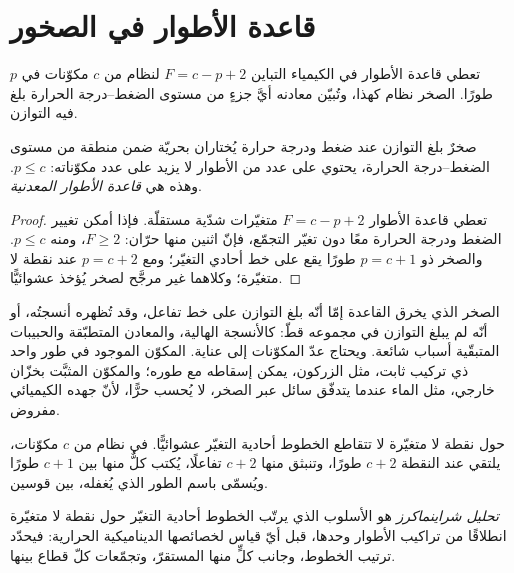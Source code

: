 \section{قاعدة الأطوار في الصخور}\label{sec:b3:petrological-thermodynamics:phase-rule}

تعطي قاعدة الأطوار في الكيمياء التباين $F = c - p + 2$ لنظام من
$c$ مكوّنات في $p$ طورًا. الصخر نظام كهذا، وتُبيّن معادنه
أيَّ جزءٍ من مستوى الضغط--درجة الحرارة بلغ فيه التوازن.

\begin{proposition}\label{prop:b3:petrological-thermodynamics:goldschmidt}
صخرٌ بلغ التوازن عند ضغط ودرجة حرارة يُختاران
بحريّة ضمن منطقة من مستوى الضغط--درجة الحرارة، يحتوي على عدد من الأطوار
لا يزيد على عدد مكوّناته: $p \le c$. وهذه هي
\emph{قاعدة الأطوار المعدنية}.
\end{proposition}

\begin{proof}
تعطي قاعدة الأطوار $F = c - p + 2$ متغيّرات شدّية مستقلّة. فإذا أمكن
تغيير الضغط ودرجة الحرارة معًا دون تغيّر التجمّع، فإنّ اثنين منها حرّان:
$F \ge 2$، ومنه $p \le c$. والصخر ذو $p = c + 1$ طورًا يقع
على خط أحادي التغيّر؛ ومع $p = c + 2$ عند نقطة لا متغيّرة؛ وكلاهما
غير مرجَّح لصخر يُؤخذ عشوائيًّا.
\end{proof}

الصخر الذي يخرق القاعدة إمّا أنّه بلغ التوازن على خط تفاعل، وقد تُظهره
أنسجتُه، أو أنّه لم يبلغ التوازن في مجموعه قطّ: كالأنسجة الهالية،
والمعادن المتطبّقة والحبيبات المتبقّية أسباب شائعة. ويحتاج عدّ المكوّنات
إلى عناية. المكوّن الموجود في طور واحد ذي تركيب ثابت، مثل
الزركون، يمكن إسقاطه مع طوره؛ والمكوّن المثبَّت بخزّان خارجي،
مثل الماء عندما يتدفّق سائل عبر الصخر، لا يُحسب
حرًّا، لأنّ جهده الكيميائي مفروض.

حول نقطة لا متغيّرة لا تتقاطع الخطوط أحادية التغيّر عشوائيًّا. في نظام
من $c$ مكوّنات، يلتقي عند النقطة $c + 2$ طورًا، وتنبثق منها $c + 2$
تفاعلًا، يُكتب كلٌّ منها بين $c + 1$ طورًا ويُسمّى باسم
الطور الذي يُغفله، بين قوسين.

\begin{definition}\label{def:b3:petrological-thermodynamics:schreinemakers}
\emph{تحليل شراينماكرز} هو الأسلوب
الذي يرتّب الخطوط أحادية التغيّر حول نقطة لا متغيّرة انطلاقًا من
تراكيب الأطوار وحدها، قبل أيّ قياس لخصائصها
الديناميكية الحرارية: فيحدّد ترتيب الخطوط، وجانب كلٍّ منها
المستقرّ، وتجمّعات كلّ قطاع بينها.
\end{definition}

